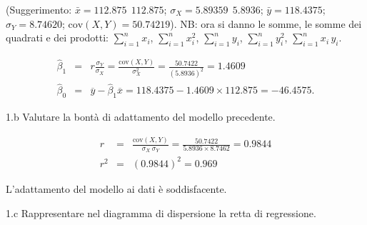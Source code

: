 \documentclass[
  11pt,
]{book}
\theoremstyle{mytheoremstyle}
\theoremstyle{mydefstyle}
\newenvironment{sol}
  {
  \begin{tcolorbox}[enhanced,breakable,arc=0.1mm,boxrule=1pt,colback=white,colframe=iblue,
  title=\bf \fontfamily{lmss}\selectfont \hspace{.5 cm} Soluzione,drop fuzzy shadow]

}{
\end{tcolorbox}
  }
\begin{document}
(Suggerimento: \(\bar{x} = 112.875~~112.875\); \(\sigma_{X} = 5.89359~~5.8936\);
\(\bar{y} = 118.4375\); \(\sigma_{Y} = 8.74620\); \(\text{cov}(X,Y)= 50.74219\)).
NB: ora si danno le somme, le somme dei quadrati e dei prodotti:
\(\sum_{i=1}^{n} x_{i}\), \(\sum_{i=1}^{n} x_{i}^{2}\),
\(\sum_{i=1}^{n} y_{i}\), \(\sum_{i=1}^{n} y_{i}^{2}\),
\(\sum_{i=1}^{n} x_{i}\, y_{i}\).

\begin{sol}
\begin{eqnarray*}
\widehat{\beta}_{1} &=& r \frac{\sigma_{Y}} {\sigma_{X}}
                     =  \frac{\text{cov}(X,Y)} {\sigma_{X}^{2}}
                     =  \frac{50.7422} {(5.8936)^{2}} = 1.4609  \\
\widehat{\beta}_{0} &=& \overline{y} - \widehat{\beta}_{1} \overline{x}
                     =  118.4375 - 1.4609 \times 112.875 = -46.4575.
\end{eqnarray*}

\end{sol}

1.b Valutare la bontà di adattamento del modello precedente.

\begin{sol}
\begin{eqnarray*}
r     &=& \frac{\text{cov}(X,Y)} {\sigma_{X}\ \sigma_{Y}}
       =  \frac{50.7422} {5.8936 \times 8.7462} = 0.9844\\
r^{2} &=& (0.9844)^{2} = 0.969
\end{eqnarray*}

L'adattamento del modello ai dati è soddisfacente.

\end{sol}

1.c Rappresentare nel diagramma di dispersione la retta di regressione.
\end{document}
